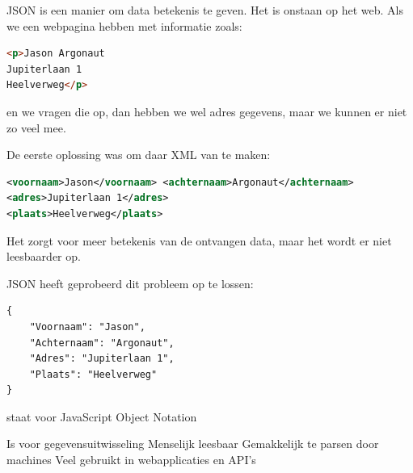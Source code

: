 JSON is een manier om data betekenis te geven. Het is onstaan op het web. Als we een webpagina hebben met informatie zoals:
\begin{lstlisting}[language=html]
<p>Jason Argonaut
Jupiterlaan 1
Heelverweg</p>
\end{lstlisting}
en we vragen die op, dan hebben we wel adres gegevens, maar we kunnen er niet zo veel mee.

De eerste oplossing was om daar XML van te maken:
\begin{lstlisting}[language=xml]
<voornaam>Jason</voornaam> <achternaam>Argonaut</achternaam>
<adres>Jupiterlaan 1</adres>
<plaats>Heelverweg</plaats>
\end{lstlisting}

Het zorgt voor meer betekenis van de ontvangen data, maar het wordt er niet leesbaarder op.

JSON heeft geprobeerd dit probleem op te lossen:
\begin{lstlisting}
{
    "Voornaam": "Jason",
    "Achternaam": "Argonaut",
    "Adres": "Jupiterlaan 1",
    "Plaats": "Heelverweg"
}
\end{lstlisting}


staat voor JavaScript Object Notation

Is voor gegevensuitwisseling
Menselijk leesbaar
Gemakkelijk te parsen door machines
Veel gebruikt in webapplicaties en API’s
